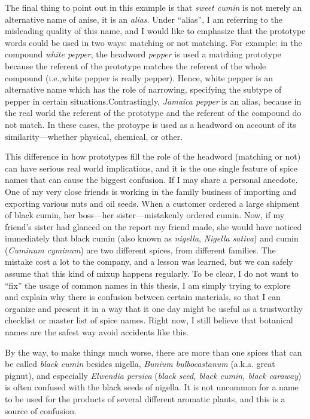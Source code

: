 The final thing to point out in this example is that \textit{sweet cumin} is not merely an alternative name of anise, it is an \textit{alias}. Under ``alias'', I am referring to the misleading quality of this name, and I would like to emphasize that the prototype words could be used in two ways: matching or not matching. For example: in the compound \textit{white pepper}, the headword \textit{pepper} is used a matching prototype because the referent of the prototype matches the referent of the whole compound (i.e.,white pepper is really pepper). Hence, white pepper is an alternative name which has the role of narrowing, specifying the subtype of pepper in certain situations.Contrastingly, \textit{Jamaica pepper} is an alias, because in the real world the referent of the prototype and the referent of the compound do not match. In these cases, the protoype is used as a headword on account of its similarity---whether physical, chemical, or other.

This difference in how prototypes fill the role of the headword (matching or not) can have serious real world implications, and it is the one single feature of spice names that can cause the biggest confusion. If I may share a personal anecdote. One of my very close friends is working in the family business of importing and exporting various nuts and oil seeds. When a customer ordered a large shipment of black cumin, her boss---her sister---mistakenly ordered cumin. Now, if my friend's sister had glanced on the report my friend made, she would have noticed immediately that black cumin (also known as \textit{nigella}, \textit{Nigella sativa}) and cumin (\textit{Cuminum cyminum}) are two different spices, from different families. The mistake cost a lot to the company, and a lesson was learned, but we can safely assume that this kind of mixup happens regularly. To be clear, I do not want to ``fix'' the usage of common names in this thesis, I am simply trying to explore and explain why there is confusion between certain materials, so that I can organize and present it in a way that it one day might be useful as a trustworthy checklist or master list of spice names. Right now, I still believe that botanical names are the safest way avoid accidents like this. 

By the way, to make things much worse, there are more than one spices that can be called \textit{black cumin} besides nigella, \textit{Bunium bulbocastanum} (a.k.a. great pignut), and especially \textit{Elwendia persica} (\textit{black seed, black cumin, black caraway}) is often confused with the black seeds of nigella. It is not uncommon for a name to be used for the products of several different aromatic plants, and this is a source of confusion.

